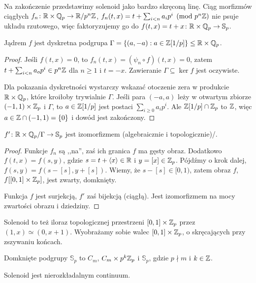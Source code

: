 Na  zakończenie przedstawimy solenoid jako bardzo skręconą linę.
Ciąg morfizmów ciągłych $f_n \colon \mathbb R \times \mathbb Q_p \to \mathbb R / p^n \mathbb Z$, $f_n (t, x) = t + \sum_{i < n} a_i p^i \pmod{p^n\mathbb Z }$
nie psuje układu rzutowego, więc faktoryzujemy go do $f (t, x) = t + x \colon \mathbb R \times \mathbb Q_p \to \mathbb S_p$.

\begin{lemat}
	Jądrem $f$ jest dyskretna podgrupa $\Gamma = \{(a, -a) : a \in \mathbb Z[1/p]\} \le \mathbb R \times \mathbb Q_p$.
\end{lemat}

\begin{proof}
	Jeśli $f(t, x) = 0$, to $f_n(t, x) = (\psi_n \circ f)(t, x) = 0$, zatem $t + \sum_{i < n} a_o p^i \in p^n\mathbb Z$ dla $n \ge 1$ i $t = -x$.
	Zawieranie $\Gamma \subseteq \ker f$ jest oczywiste.

	Dla pokazania dyskretności wystarczy wskazać otoczenie zera w produkcie $\mathbb R \times \mathbb Q_p$, które kroiłoby trywialnie $\Gamma$.
	Jeśli para $(-a, a)$ leży w otwartym zbiorze $(-1, 1) \times \mathbb Z_p$ i $\Gamma$, to $a \in \mathbb Z[1/p]$ jest postaci $\sum_{i \ge 0} a_i p^i$.
	Ale $\mathbb Z[1/p] \cap \mathbb Z_p$ to $\mathbb Z$, więc $a \in \mathbb Z \cap (-1, 1) = \{0\}$ i dowód jest zakończony.
\end{proof}

\begin{fakt}
	$f' \colon \mathbb R \times \mathbb Q_p / \Gamma \to \mathbb S_p$ jest izomorfizmem (algebraicznie i topologicznie)/.
\end{fakt}

\begin{proof}
	Funkcje $f_n$ są ,,na'', zaś ich granica $f$ ma gęsty obraz.
	Dodatkowo $f(t, x) = f(s, y)$, gdzie $s = t + \langle x \rangle \in \mathbb R$ i $y = [x] \in \mathbb Z_p$.
	Pójdźmy o krok dalej, $f(s, y) = f(s - [s], y + [s])$.
	Wiemy, że $s - [s] \in [0, 1)$, zatem obraz $f$, $f[[0,1] \times \mathbb Z_p]$, jest zwarty, domknięty.

	Funkcja $f$ jest surjekcją, $f'$ zaś bijekcją (ciągłą).
	Jest izomorfizmem na mocy zwartości obrazu i dziedziny.
\end{proof}

Solenoid to też iloraz topologicznej przestrzeni $[0, 1] \times \mathbb Z_p$ przez $(1, x) \simeq (0, x+1)$.
Wyobrażamy sobie walec $[0,1] \times \mathbb Z_p$, o skręcających przy zszywaniu końcach.

\begin{fakt}
	Domknięte  podgrupy $\mathbb S_p$ to $C_m$, $C_m \times p^k\mathbb Z_p$ i $\mathbb S_p$, gdzie $p \nmid m$ i $k \in \mathbb Z$.
\end{fakt}

\begin{fakt}
	Solenoid jest nierozkładalnym continuum.
\end{fakt}
